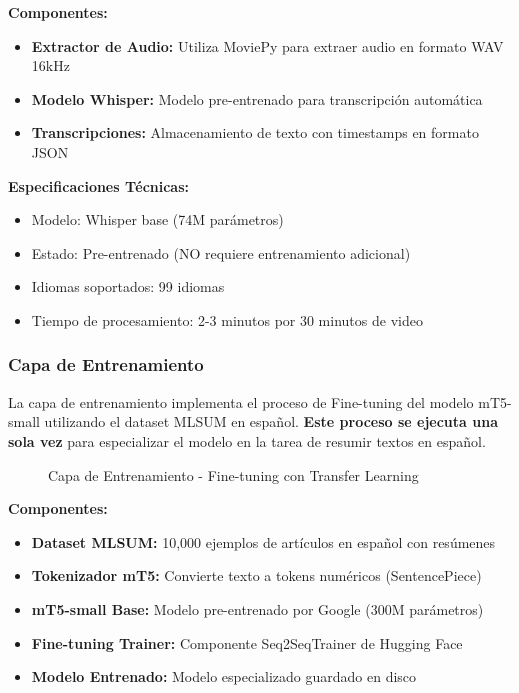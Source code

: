 \documentclass[12pt,a4paper]{article}
\begin{document}
\textbf{Componentes:}
\begin{itemize}
    \item \textbf{Extractor de Audio:} Utiliza MoviePy para extraer audio en formato WAV 16kHz
    \item \textbf{Modelo Whisper:} Modelo pre-entrenado para transcripción automática
    \item \textbf{Transcripciones:} Almacenamiento de texto con timestamps en formato JSON
\end{itemize}

\textbf{Especificaciones Técnicas:}
\begin{itemize}
    \item Modelo: Whisper base (74M parámetros)
    \item Estado: Pre-entrenado (NO requiere entrenamiento adicional)
    \item Idiomas soportados: 99 idiomas
    \item Tiempo de procesamiento: 2-3 minutos por 30 minutos de video
\end{itemize}

\newpage

\subsubsection{Capa de Entrenamiento}

La capa de entrenamiento implementa el proceso de Fine-tuning del modelo mT5-small utilizando el dataset MLSUM en español. \textbf{Este proceso se ejecuta una sola vez} para especializar el modelo en la tarea de resumir textos en español.

\begin{figure}[H]
    \centering
    \caption{Capa de Entrenamiento - Fine-tuning con Transfer Learning}
    \label{fig:capa_entrenamiento}
\end{figure}

\textbf{Componentes:}
\begin{itemize}
    \item \textbf{Dataset MLSUM:} 10,000 ejemplos de artículos en español con resúmenes
    \item \textbf{Tokenizador mT5:} Convierte texto a tokens numéricos (SentencePiece)
    \item \textbf{mT5-small Base:} Modelo pre-entrenado por Google (300M parámetros)
    \item \textbf{Fine-tuning Trainer:} Componente Seq2SeqTrainer de Hugging Face
    \item \textbf{Modelo Entrenado:} Modelo especializado guardado en disco
\end{itemize}
\end{document}
